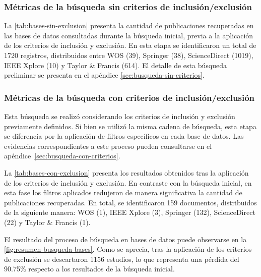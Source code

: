 


\subsubsection{Métricas de la búsqueda sin criterios de inclusión/exclusión}\label{subsubsec:resumen-busqueda}

La \autoref{tab:bases-sin-exclusion} presenta la cantidad de publicaciones recuperadas en las bases de datos consultadas durante la búsqueda inicial, previa a la aplicación de los criterios de inclusión y exclusión. En esta etapa se identificaron un total de 1720 registros, distribuidos entre WOS (39), Springer (38), ScienceDirect (1019), IEEE Xplore (10) y Taylor \& Francis (614). El detalle de esta búsqueda preliminar se presenta en el apéndice \ref{sec:busqueda-sin-criterios}.




\subsubsection{Métricas de la búsqueda con criterios de inclusión/exclusión}\label{subsec:resumen-busqueda-citerios}

Esta búsqueda se realizó considerando los criterios de inclusión y exclusión previamente definidos. Si bien se utilizó la misma cadena de búsqueda, esta etapa se diferencia por la aplicación de filtros específicos en cada base de datos. Las evidencias correspondientes a este proceso pueden consultarse en el apéndice~\ref{sec:busqueda-con-criterios}.

La \autoref{tab:bases-con-exclusion} presenta los resultados obtenidos tras la aplicación de los criterios de inclusión y exclusión. En contraste con la búsqueda inicial, en esta fase los filtros aplicados redujeron de manera significativa la cantidad de publicaciones recuperadas. En total, se identificaron 159 documentos, distribuidos de la siguiente manera: WOS (1), IEEE Xplore (3), Springer (132), ScienceDirect (22) y Taylor \& Francis (1).



El resultado del proceso de búsqueda en bases de datos puede observarse en la \autoref{fig:resumen-busqueda-bases}. Como se aprecia, tras la aplicación de los criterios de exclusión se descartaron 1156 estudios, lo que representa una pérdida del 90.75\% respecto a los resultados de la búsqueda inicial.

